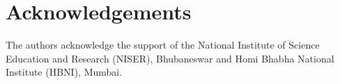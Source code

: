 \documentclass[a4paper,11pt]{amsart}
\numberwithin{equation}{section}
\numberwithin{equation}{subsection}
\newcommand{\poonam}[1]{{\color{blue} #1}}
\begin{document}
\section*{Acknowledgements}
The authors acknowledge the support of the National Institute of Science Education and Research (NISER), Bhubaneswar and Homi Bhabha National Institute (HBNI), Mumbai.





\end{document}
